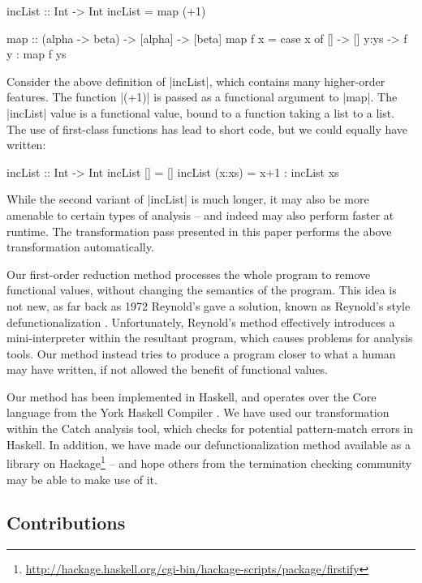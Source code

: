 \documentclass[preprint]{sigplanconf}
\begin{document}
\begin{example}
\label{ex:incList}
\begin{code}
incList :: Int -> Int
incList = map (+1)

map :: (alpha -> beta) -> [alpha] -> [beta]
map f x = case  x of
                []    -> []
                y:ys  -> f y : map f ys
\end{code}

Consider the above definition of |incList|, which contains many higher-order features. The function |(+1)| is passed as a functional argument to |map|. The |incList| value is a functional value, bound to a function taking a list to a list. The use of first-class functions has lead to short code, but we could equally have written:

\begin{code}
incList :: Int -> Int
incList []      = []
incList (x:xs)  = x+1 : incList xs
\end{code}

While the second variant of |incList| is much longer, it may also be more amenable to certain types of analysis -- and indeed may also perform faster at runtime. The transformation pass presented in this paper performs the above transformation automatically.
\end{example}

Our first-order reduction method processes the whole program to remove functional values, without changing the semantics of the program. This idea is not new, as far back as 1972 Reynold's gave a solution, known as Reynold's style defunctionalization \cite{reynolds:defunc}. Unfortunately, Reynold's method effectively introduces a mini-interpreter within the resultant program, which causes problems for analysis tools. Our method instead tries to produce a program closer to what a human may have written, if not allowed the benefit of functional values.

Our method has been implemented in Haskell, and operates over the Core language from the York Haskell Compiler \cite{me:yhc_core}. We have used our transformation within the Catch analysis tool, which checks for potential pattern-match errors in Haskell. In addition, we have made our defunctionalization method available as a library on Hackage\footnote{\url{http://hackage.haskell.org/cgi-bin/hackage-scripts/package/firstify}} -- and hope others from the termination checking community may be able to make use of it.

\subsection{Contributions}
\end{document}
